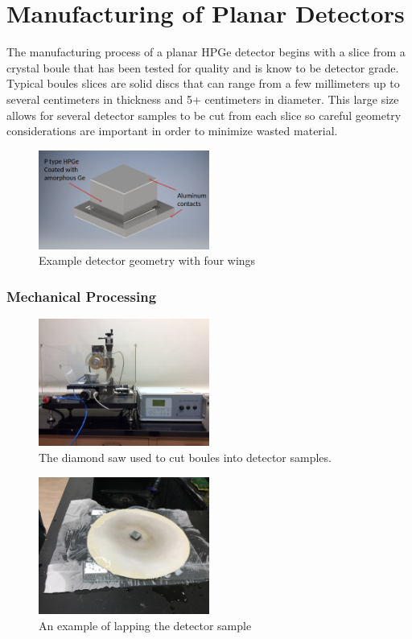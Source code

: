 \chapter{Manufacturing of Planar Detectors}
The manufacturing process of a planar HPGe detector begins with a slice from a crystal boule that has been tested for quality and is know to be detector grade. Typical boules slices are solid discs that can range from a few millimeters up to several centimeters in thickness and 5+ centimeters in diameter. This large size allows for several detector samples to be cut from each slice so careful geometry considerations are important in order to minimize wasted material.
\begin{figure}[htpb]
\centering
\includegraphics[width=0.5\textwidth]{figures/dummy-det}
\caption{Example detector geometry with four wings}
\label{dummydet}
\end{figure}


\subsection{Mechanical Processing}

\begin{figure}[htpb]
\centering
\includegraphics[width=0.5\textwidth]{figures/diamond-saw.jpg}
\caption{The diamond saw used to cut boules into detector samples.}
\label{diamondsaw}
\end{figure}

\begin{figure}[htpb]
\centering
\includegraphics[width=0.5\textwidth]{figures/lapping.jpg}
\caption{An example of lapping the detector sample}
\label{lapping}
\end{figure}

